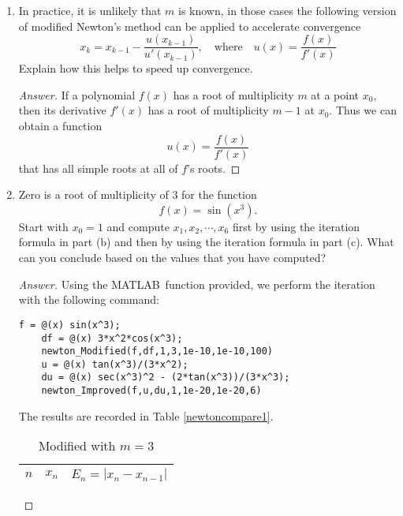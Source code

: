 \begin{enumerate}
\begin{proof}
\[		\frac{(x_{k-1}-x^*)h(x_{k-1})}{h(x_{k-1})+\frac{1}{m}(x_{k-1}-x^*)h'(x_{k-1})}. \]
		Define the error term \(E_k=x_k-x^*\), then
		\[ E_k = E_{k-1} \left( 1 - 
		\frac{1}{1+\frac{1}{m} E_{k-1}\frac{h'(x^*+E_{k-1})}{h(x^*+E_{k-1})}}\right). \]
		A first order approximation gives
		\[ E_k \approx E_{k-1}^2 \cdot
		\frac{h'(x^*+E_{k-1})}{m\cdot h(x^*+E_{k-1})}. \]
		So the quadratic convergence is proved.
	\end{proof}
	\item In practice, it is unlikely that $m$ is known, in those cases the following version of modified Newton's method can be applied to accelerate convergence
	\[ x_k=x_{k-1}-\frac{u(x_{k-1})}{u'(x_{k-1})}, \quad \text{where} \quad u(x)=\frac{f(x)}{f'(x)} \]
	Explain how this helps to speed up convergence.
	\begin{proof}[Answer]
		 If a polynomial \(f(x)\) has a root of multiplicity \(m\) at a point \(x_0\), then its derivative \(f'(x)\) has a root of multiplicity \(m-1\) at \(x_0\).
		 Thus we can obtain a function
		 \[ u(x)=\frac{f(x)}{f'(x)} \]
		 that  has  all  simple roots at all of \(f\)'s roots.
	\end{proof}
	\item Zero is a root of multiplicity of 3 for the function
	\[ f(x)=\sin(x^3). \]
	Start with \(x_0=1\) and compute \(x_1, x_2, \cdots, x_6\) first by using the iteration formula in part (b) and then by using the iteration formula in part (c).
	What can you conclude based on the values that you have computed?
	\begin{proof}[Answer]
	Using the MATLAB\texttrademark\ function provided, we perform the iteration with the following command:
	\begin{lstlisting}[style=Matlab-editor]
	f = @(x) sin(x^3);
	df = @(x) 3*x^2*cos(x^3);
	newton_Modified(f,df,1,3,1e-10,1e-10,100)
	u = @(x) tan(x^3)/(3*x^2);
	du = @(x) sec(x^3)^2 - (2*tan(x^3))/(3*x^3);
	newton_Improved(f,u,du,1,1e-20,1e-20,6)
	\end{lstlisting}
	The results are recorded in Table \ref{newtoncompare1}.
	\ifnum{}
		\begin{table}[H]
		\centering
		\begin{subtable}[t]{.8\textwidth}
	\else
		\begin{table}[htbp]
		\begin{subtable}[t]{.49\linewidth}	
	\fi		
			\centering
			\caption{Modified with \(m=3\)}
			\begin{tabular}[t]{|c|c|c|}
			\hline
			\normalsize	$n$	&	\normalsize	\(x_n\)	&	\normalsize	\(E_n=|x_n-x_{n-1}|\)	\\	\hline

\end{tabular}
\end{subtable}
\end{table}
\end{subtable}
\end{table}
\end{proof}
\end{enumerate}
